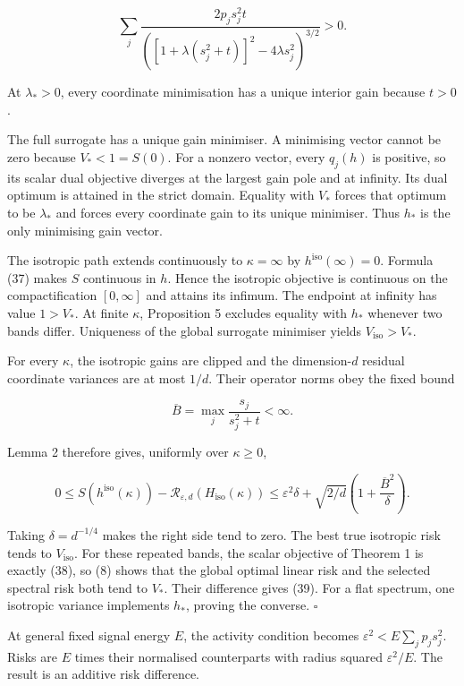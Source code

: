 \documentclass[11pt,a4paper]{article}
\begin{document}
\[
\sum_j
\frac{2p_js_j^2t}
{\left([1+\lambda(s_j^2+t)]^2-4\lambda s_j^2\right)^{3/2}}>0.
\tag{40}
\]

At \(\lambda_*>0\), every coordinate minimisation has a unique interior
gain because \(t>0\).

The full surrogate has a unique gain minimiser. A minimising vector
cannot be zero because \(V_*<1=S(0)\). For a nonzero vector, every
\(q_j(h)\) is positive, so its scalar dual objective diverges at the
largest gain pole and at infinity. Its dual optimum is attained in the
strict domain. Equality with \(V_*\) forces that optimum to be
\(\lambda_*\) and forces every coordinate gain to its unique minimiser.
Thus \(h_*\) is the only minimising gain vector.

The isotropic path extends continuously to \(\kappa=\infty\) by
\(h^{\mathrm{iso}}(\infty)=0\). Formula (37) makes \(S\) continuous in
\(h\). Hence the isotropic objective is continuous on the
compactification \([0,\infty]\) and attains its infimum. The endpoint at
infinity has value \(1>V_*\). At finite \(\kappa\), Proposition 5
excludes equality with \(h_*\) whenever two bands differ. Uniqueness of
the global surrogate minimiser yields \(V_{\mathrm{iso}}>V_*\).

For every \(\kappa\), the isotropic gains are clipped and the
dimension-\(d\) residual coordinate variances are at most \(1/d\). Their
operator norms obey the fixed bound

\[
\overline B=\max_j\frac{s_j}{s_j^2+t}<\infty.
\]

Lemma 2 therefore gives, uniformly over \(\kappa\ge0\),

\[
0\le S(h^{\mathrm{iso}}(\kappa))
-\mathcal R_{\varepsilon,d}(H_{\mathrm{iso}}(\kappa))
\le\varepsilon^2\delta+
\sqrt{2/d}\left(1+\frac{\overline B^2}{\delta}\right).
\tag{41}
\]

Taking \(\delta=d^{-1/4}\) makes the right side tend to zero. The best
true isotropic risk tends to \(V_{\mathrm{iso}}\). For these repeated
bands, the scalar objective of Theorem 1 is exactly (38), so (8) shows
that the global optimal linear risk and the selected spectral risk both
tend to \(V_*\). Their difference gives (39). For a flat spectrum, one
isotropic variance implements \(h_*\), proving the converse. \(\square\)

At general fixed signal energy \(E\), the activity condition becomes
\(\varepsilon^2<E\sum_jp_js_j^2\). Risks are \(E\) times their
normalised counterparts with radius squared \(\varepsilon^2/E\). The
result is an additive risk difference.
\end{document}
